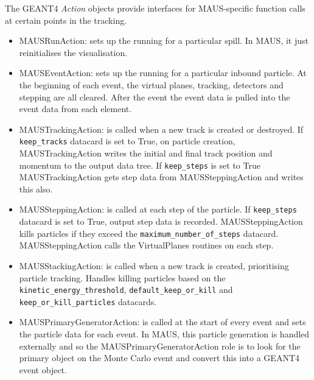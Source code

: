 The GEANT4 \emph{Action} objects provide interfaces for MAUS-specific function calls at certain points in the tracking.

\begin{itemize}
\item MAUSRunAction: sets up the running for a particular spill. In MAUS, it just reinitialises the visualisation.
\item MAUSEventAction: sets up the running for a particular inbound particle. At the beginning of each event, the virtual planes, tracking, detectors and stepping are all cleared. After the event the event data is pulled into the event data from each element.
\item MAUSTrackingAction: is called when a new track is created or destroyed. If \verb|keep_tracks| datacard is set to True, on particle creation, MAUSTrackingAction writes the initial and final track position and momentum to the output data tree. If \verb|keep_steps| is set to True MAUSTrackingAction gets step data from MAUSSteppingAction and writes this also.
\item MAUSSteppingAction: is called at each step of the particle. If \verb|keep_steps| datacard is set to True, output step data is recorded. MAUSSteppingAction kills particles if they exceed the \verb|maximum_number_of_steps| datacard. MAUSSteppingAction calls the VirtualPlanes routines on each step.
\item MAUSStackingAction: is called when a new track is created, prioritising particle tracking. Handles killing particles based on the \verb|kinetic_energy_threshold|, \verb|default_keep_or_kill| and \verb|keep_or_kill_particles| datacards.
\item MAUSPrimaryGeneratorAction: is called at the start of every event and sets the particle data for each event. In MAUS, this particle generation is handled externally and so the MAUSPrimaryGeneratorAction role is to look for the primary object on the Monte Carlo event and convert this into a GEANT4 event object.
\end{itemize}

